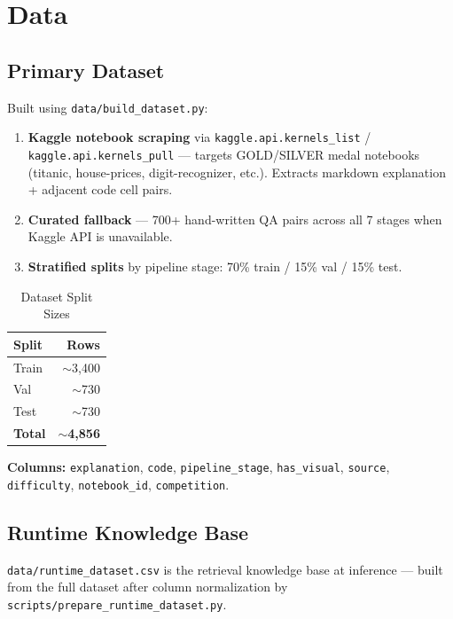 \documentclass[12pt,a4paper]{article}
\begin{document}
\section{Data}

\subsection{Primary Dataset}

Built using \texttt{data/build\_dataset.py}:

\begin{enumerate}[leftmargin=*]
  \item \textbf{Kaggle notebook scraping} via \texttt{kaggle.api.kernels\_list} / \texttt{kaggle.api.kernels\_pull} --- targets GOLD/SILVER medal notebooks (titanic, house-prices, digit-recognizer, etc.). Extracts markdown explanation + adjacent code cell pairs.
  \item \textbf{Curated fallback} --- 700+ hand-written QA pairs across all 7 stages when Kaggle API is unavailable.
  \item \textbf{Stratified splits} by pipeline stage: 70\% train / 15\% val / 15\% test.
\end{enumerate}

\begin{table}[h!]
\centering
\caption{Dataset Split Sizes}
\begin{tabular}{lr}
\toprule
Split & Rows \\
\midrule
Train & $\sim$3,400 \\
Val   & $\sim$730  \\
Test  & $\sim$730  \\
\textbf{Total} & \textbf{$\sim$4,856} \\
\bottomrule
\end{tabular}
\end{table}

\textbf{Columns:} \texttt{explanation}, \texttt{code}, \texttt{pipeline\_stage}, \texttt{has\_visual}, \texttt{source}, \texttt{difficulty}, \texttt{notebook\_id}, \texttt{competition}.

\subsection{Runtime Knowledge Base}

\texttt{data/runtime\_dataset.csv} is the retrieval knowledge base at inference --- built from the full dataset after column normalization by \texttt{scripts/prepare\_runtime\_dataset.py}.
\end{document}
